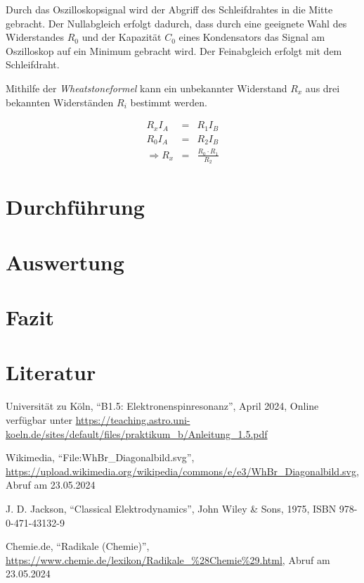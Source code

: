 \documentclass[12pt,a4paper]{scrartcl}
\numberwithin{equation}{section} %
\begin{document}
Durch das Oszilloskopsignal wird der Abgriff des Schleifdrahtes in die
Mitte gebracht. Der Nullabgleich erfolgt dadurch, dass durch eine
geeignete Wahl des Widerstandes $R_0$ und der Kapazität $C_0$ eines
Kondensators das Signal am Oszilloskop auf ein Minimum gebracht wird.
Der Feinabgleich erfolgt mit dem Schleifdraht.

Mithilfe der \emph{Wheatstoneformel} kann ein unbekannter Widerstand
$R_x$ aus drei bekannten Widerständen $R_i$ bestimmt werden.

\begin{eqnarray}
    R_x I_A &=& R_1 I_B \\
    R_0 I_A &=& R_2 I_B \\
    \Rightarrow R_x &=& \frac{R_0\cdot R_1}{R_2}
\end{eqnarray}

\clearpage
\hypertarget{durchfuxfchrung}{%
\section{Durchführung}\label{durchfuxfchrung}}

\clearpage
\hypertarget{auswertung}{%
\section{Auswertung}\label{auswertung}}

\clearpage
\hypertarget{fazit}{%
\section{Fazit}\label{fazit}}

\clearpage
\hypertarget{literatur}{%
\section{Literatur}\label{literatur}}
\renewcommand{\section}[2]{}

\begin{thebibliography}{99}
	Universität zu Köln, ``B1.5: Elektronenspinresonanz'', April 2024, Online verfügbar unter 
	\url{https://teaching.astro.uni-koeln.de/sites/default/files/praktikum_b/Anleitung_1.5.pdf}

	Wikimedia, ``File:WhBr\_Diagonalbild.svg'',
	\url{https://upload.wikimedia.org/wikipedia/commons/e/e3/WhBr_Diagonalbild.svg},
	Abruf am 23.05.2024

	J. D. Jackson, ``Classical Elektrodynamics'', John Wiley \& Sons,
	1975, ISBN 978-0-471-43132-9

	Chemie.de, ``Radikale (Chemie)'',
	\url{https://www.chemie.de/lexikon/Radikale_\%28Chemie\%29.html}, Abruf am 23.05.2024

\end{thebibliography}
\end{document}
